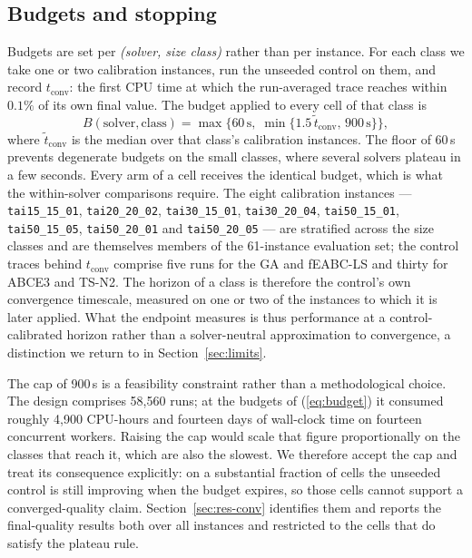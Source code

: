 \documentclass[review]{elsarticle}
\begin{document}
\subsection{Budgets and stopping}
Budgets are set per \emph{(solver, size class)} rather than per instance.
For each class we take one or two calibration instances, run the unseeded
control on them, and record $t_{\mathrm{conv}}$: the first CPU time at
which the run-averaged trace reaches within $0.1\%$ of its own final
value. The budget applied to every cell of that class is
\begin{equation}\label{eq:budget}
B(\text{solver},\text{class})=
\max\bigl\{60\,\mathrm{s},\;
\min\{1.5\,\tilde{t}_{\mathrm{conv}},\,900\,\mathrm{s}\}\bigr\},
\end{equation}
where $\tilde{t}_{\mathrm{conv}}$ is the median over that class's
calibration instances. The floor of 60\,s prevents degenerate budgets on
the small classes, where several solvers plateau in a few seconds. Every
arm of a cell receives the identical budget, which is what the
within-solver comparisons require. The eight calibration instances ---
\texttt{tai15\_15\_01}, \texttt{tai20\_20\_02}, \texttt{tai30\_15\_01},
\texttt{tai30\_20\_04}, \texttt{tai50\_15\_01}, \texttt{tai50\_15\_05},
\texttt{tai50\_20\_01} and \texttt{tai50\_20\_05} --- are stratified across
the size classes and are themselves members of the 61-instance evaluation
set; the control traces behind $t_{\mathrm{conv}}$ comprise five runs for
the GA and fEABC-LS and thirty for ABCE3 and TS-N2. The horizon of a class
is therefore the control's own convergence timescale, measured on one or
two of the instances to which it is later applied. What the endpoint
measures is thus performance at a control-calibrated horizon rather than a
solver-neutral approximation to convergence, a distinction we return to in
Section~\ref{sec:limits}.

The cap of 900\,s is a feasibility constraint rather than a methodological
choice. The design comprises 58{,}560 runs; at the budgets of
(\ref{eq:budget}) it consumed roughly 4{,}900 CPU-hours and fourteen days
of wall-clock time on fourteen concurrent workers. Raising the cap would
scale that figure proportionally on the classes that reach it, which are
also the slowest. We therefore accept the cap and treat its consequence
explicitly: on a substantial fraction of cells the unseeded control is
still improving when the budget expires, so those cells cannot support a
converged-quality claim. Section~\ref{sec:res-conv} identifies them and
reports the final-quality results both over all instances and restricted
to the cells that do satisfy the plateau rule.
\end{document}
